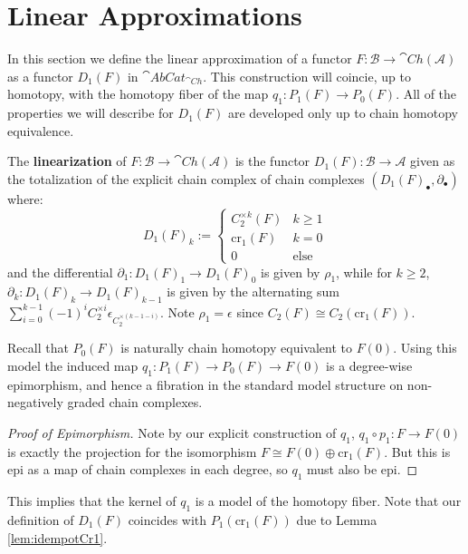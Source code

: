 \section{Linear Approximations}


In this section we define the linear approximation of a functor $F:\mathcal{B}\rightarrow \cat{Ch}(\mathcal{A})$ as a functor $D_1(F)$ in $\cat{AbCat}_{\cat{Ch}}$. This construction will coincie, up to homotopy, with the homotopy fiber of the map $q_1:P_1(F)\to P_0(F)$. All of the properties we will describe for $D_1(F)$ are developed only up to  chain homotopy equivalence.

\begin{defn}[label=defn:linearization]
    The \textbf{linearization} of $F:\mathcal{B}\rightarrow \cat{Ch}(\mathcal{A})$ is the functor $D_1(F):\mathcal{B}\rightarrow \mathcal{A}$ given as the totalization of the explicit chain complex of chain complexes $(D_1(F)_\bullet,\partial_\bullet)$ where:
    \begin{equation*}
        D_1(F)_k := \left\{\begin{array}{cc} C_2^{\times k}(F) & k \geq 1 \\ \text{cr}_1(F) & k = 0 \\ 0 & \text{else} \end{array}\right.
    \end{equation*}
    and the differential $\partial_1:D_1(F)_1\rightarrow D_1(F)_0$ is given by $\rho_1$, while for $k \geq 2$, $\partial_k:D_1(F)_k\rightarrow D_1(F)_{k-1}$ is given by the alternating sum $\sum_{i=0}^{k-1}(-1)^iC_2^{\times i}\epsilon_{C_2^{\times (k-1-i)}}$. Note $\rho_1 = \epsilon$ since $C_2(F) \cong C_2(\text{cr}_1(F))$.
\end{defn}

Recall that $P_0(F)$ is naturally chain homotopy equivalent to $F(0)$. Using this model the induced map $q_1:P_1(F)\to P_0(F)\to F(0)$ is a degree-wise epimorphism, and hence a fibration in the standard model structure on non-negatively graded chain complexes.

\begin{proof}[Proof of Epimorphism]
    Note by our explicit construction of $q_1$, $q_1\circ p_1:F\to F(0)$ is exactly the projection for the isomorphism $F \cong F(0)\oplus \text{cr}_1(F)$. But this is epi as a map of chain complexes in each degree, so $q_1$ must also be epi.
\end{proof}

This implies that the kernel of $q_1$ is a model of the homotopy fiber. Note that our definition of $D_1(F)$ coincides with $P_1(\text{cr}_1(F))$ due to Lemma \ref{lem:idempotCr1}. 

